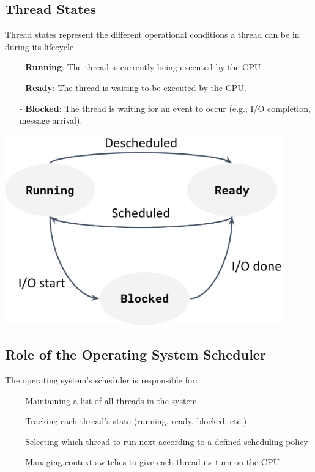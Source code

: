 \documentclass[../../compsys.tex]{subfiles}
\begin{document}
\subsection{Thread States}
Thread states represent the different operational conditions a thread can be in during its lifecycle.
\begin{minipage}{0.45\textwidth}
    \begin{itemize}
        \item[-] \textbf{Running}: The thread is currently being executed by the CPU.
        \item[-] \textbf{Ready}: The thread is waiting to be executed by the CPU.
        \item[-] \textbf{Blocked}: The thread is waiting for an event to occur (e.g., I/O completion, message arrival).
    \end{itemize}
\end{minipage}
\hfill
\begin{minipage}{0.45\textwidth}
    \centering
    \includegraphics[width=0.9\textwidth]{images/thread_states.png}
\end{minipage}


\subsection{Role of the Operating System Scheduler}
The operating system's scheduler is responsible for:
\begin{itemize}
    \item[-] Maintaining a list of all threads in the system
    \item[-] Tracking each thread's state (running, ready, blocked, etc.)
    \item[-] Selecting which thread to run next according to a defined scheduling policy
    \item[-] Managing context switches to give each thread its turn on the CPU
\end{itemize}
\end{document}
